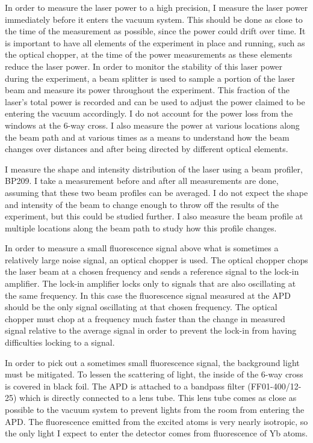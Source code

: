 \documentclass[12pt, a4paper]{article}
\begin{document}
In order to measure the laser power to a high precision, I measure the laser power immediately before it enters the vacuum system. This should be done as close to the time of the measurement as possible, since the power could drift over time. It is important to have all elements of the experiment in place and running, such as the optical chopper, at the time of the power measurements as these elements reduce the laser power. In order to monitor the stability of this laser power during the experiment, a beam splitter is used to sample a portion of the laser beam and measure its power throughout the experiment. This fraction of the laser's total power is recorded and can be used to adjust the power claimed to be entering the vacuum accordingly. I do not account for the power loss from the windows at the 6-way cross. I also measure the power at various locations along the beam path and at various times as a means to understand how the beam changes over distances and after being directed by different optical elements.

I measure the shape and intensity distribution of the laser using a beam profiler, BP209. I take a measurement before and after all measurements are done, assuming that these two beam profiles can be averaged. I do not expect the shape and intensity of the beam to change enough to throw off the results of the experiment, but this could be studied further. I also measure the beam profile at multiple locations along the beam path to study how this profile changes. 

In order to measure a small fluorescence signal above what is sometimes a relatively large noise signal, an optical chopper is used. The optical chopper chops the laser beam at a chosen frequency and sends a reference signal to the lock-in amplifier. The lock-in amplifier locks only to signals that are also oscillating at the same frequency. In this case the fluorescence signal measured at the APD should be the only signal oscillating at that chosen frequency. The optical chopper must chop at a frequency much faster than the change in measured signal relative to the average signal in order to prevent the lock-in from having difficulties locking to a signal.  

In order to pick out a sometimes small fluorescence signal, the background light must be mitigated. To lessen the scattering of light, the inside of the 6-way cross is covered in black foil. The APD is attached to a bandpass filter (FF01-400/12-25) which is directly connected to a lens tube. This lens tube comes as close as possible to the vacuum system to prevent lights from the room from entering the APD. The fluorescence emitted from the excited atoms is very nearly isotropic, so the only light I expect to enter the detector comes from fluorescence of Yb atoms.
\end{document}
